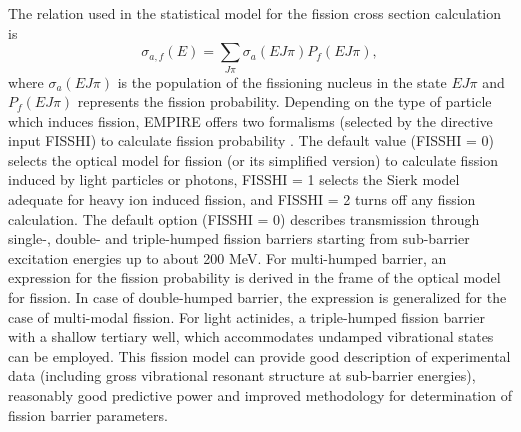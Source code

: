 \documentclass[twocolumn,amsmath,amssymb,10pt,groupedaddress,a4paper]{revtex4}
\begin{document}
The relation used in the statistical model for the fission cross section
calculation is
\begin{equation}
\sigma_{a,f}(E)=\sum_{J\pi}\sigma_{a}(EJ\pi)P_{f}(EJ\pi),
\end{equation}
\noindent where $\sigma_{a}(EJ\pi)$ is the population of the fissioning nucleus
in the state $EJ\pi$ and $P_{f}(EJ\pi)$ represents the fission probability.
Depending on the type of particle which induces fission, EMPIRE
offers two formalisms (selected by the directive input FISSHI) to
calculate fission probability . The default value (FISSHI = 0) selects
the optical model for fission (or its simplified version) to calculate
fission induced by light particles or photons, FISSHI = 1 selects
the Sierk model adequate for heavy ion induced fission, and FISSHI
= 2 turns off any fission calculation.
The default option (FISSHI = 0)  describes transmission through single-,
double- and triple-humped fission barriers starting from sub-barrier
excitation energies up to about 200 MeV. For multi-humped barrier,
an expression for the fission probability is derived in the frame
of the optical model for fission. In case of double-humped barrier,
the expression is generalized for the case of multi-modal fission.
For light actinides, a triple-humped fission barrier with a shallow
tertiary well, which accommodates undamped vibrational states can
be employed. This fission model can provide good description of experimental
data (including gross vibrational resonant structure at sub-barrier
energies), reasonably good predictive power and improved methodology
for determination of fission barrier parameters.
\end{document}

